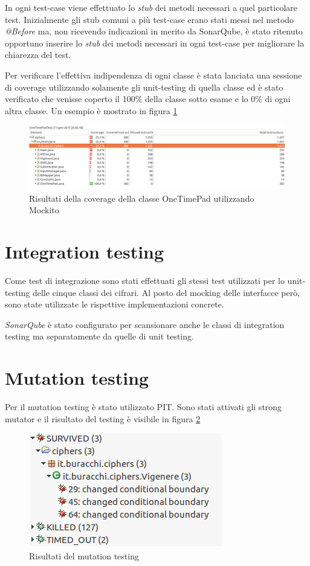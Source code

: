 		In ogni test-case viene effettuato lo \emph{stub} dei metodi necessari a quel particolare test. Inizialmente gli stub comuni a più test-case erano stati messi nel metodo \emph{@Before} ma, non ricevendo indicazioni in merito da SonarQube, è stato ritenuto opportuno inserire lo \emph{stub} dei metodi necessari in ogni test-case per migliorare la chiarezza del test.
		
		Per verificare l'effettiva indipendenza di ogni classe è stata lanciata una sessione di coverage utilizzando solamente gli unit-testing di quella classe ed è stato verificato che venisse coperto il 100\% della classe sotto esame e lo 0\% di ogni altra classe. Un esempio è mostrato in figura \ref{fig:unit}
		
		\begin{figure}[h]
			\centering
			\includegraphics[scale=0.3]{img/single-test}
			\caption{Risultati della coverage della classe OneTimePad utilizzando Mockito}
			\label{fig:unit}
		\end{figure}
		
	\section{Integration testing}
		Come test di integrazione sono stati effettuati gli stessi test utilizzati per lo unit-testing delle cinque classi dei cifrari. Al posto del mocking delle interfacce però, sono state utilizzate le rispettive implementazioni concrete.
		
		\emph{SonarQube} è stato configurato per scansionare anche le classi di integration testing ma separatamente da quelle di unit testing.
		
	\section{Mutation testing}
		Per il mutation testing è stato utilizzato PIT. Sono stati attivati gli strong mutator e il risultato del testing è visibile in figura \ref{fig:pit}
		
		\begin{figure}[h]
			\centering
			\includegraphics[scale=0.5]{img/PIT}
			\caption{Risultati del mutation testing}
			\label{fig:pit}
		\end{figure}
		
